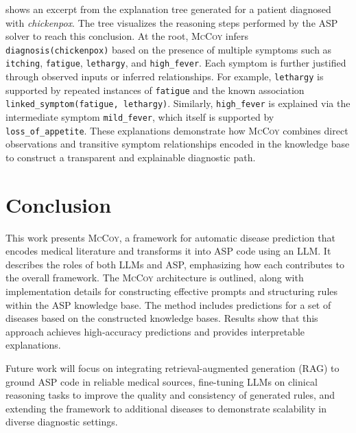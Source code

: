 \documentclass[11pt,leqno]{amsart}
\newcommand{\sys}{\textsc{McCoy}\xspace}
\begin{document}
 shows an excerpt from the explanation 
tree generated for a patient diagnosed with \textit{chickenpox}. 
The tree visualizes the reasoning steps performed by the ASP solver to reach this conclusion. 
At the root, \sys infers \texttt{diagnosis(chickenpox)} 
based on the presence of multiple symptoms such as \texttt{itching}, \texttt{fatigue}, \texttt{lethargy}, 
and \texttt{high\_fever}. 
Each symptom is further justified through observed inputs or inferred relationships. 
For example, \texttt{lethargy} is supported by repeated instances of \texttt{fatigue} 
and the known association \texttt{linked\_symptom(fatigue, lethargy)}. 
Similarly, \texttt{high\_fever} is explained via the intermediate symptom \texttt{mild\_fever}, 
which itself is supported by \texttt{loss\_of\_appetite}. 
These explanations demonstrate how \sys combines direct observations 
and transitive symptom relationships encoded in the knowledge base to 
construct a transparent and explainable diagnostic path.

\section{Conclusion}\label{sec:conclusion}

This work presents \sys, a framework for automatic disease prediction 
that encodes medical literature and transforms it into ASP code using an LLM. 
It describes the roles of both LLMs and ASP, emphasizing how each contributes to the overall framework. 
The \sys architecture is outlined, along with implementation details for constructing effective prompts 
and structuring rules within the ASP knowledge base.
The method includes predictions for a set of diseases based on the constructed knowledge bases. 
Results show that this approach achieves high-accuracy predictions and provides interpretable explanations.

Future work will focus on integrating retrieval-augmented generation (RAG) 
to ground ASP code in reliable medical sources, fine-tuning LLMs on clinical reasoning tasks 
to improve the quality and consistency of generated rules, 
and extending the framework to additional diseases to demonstrate scalability in diverse diagnostic settings.

\newpage


\end{document}
